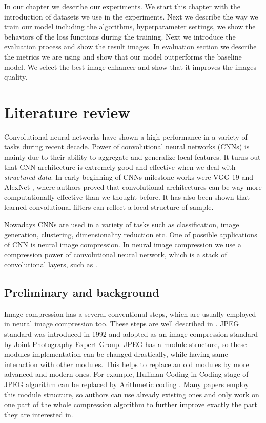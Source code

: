 In our  chapter we describe our experiments. We start this chapter with the introduction of datasets we use in the experiments. Next we describe the way we train our model including the algorithms, hyperparameter settings, we show the behaviors of the loss functions during the training. Next we introduce the evaluation process and show the result images. In evaluation section we describe the metrics we are using and show that our model outperforms the baseline model. We select the best image enhancer and show that it improves the images quality.

\chapter{Literature review}
\label{chapter:literature}

Convolutional neural networks have shown a high performance in a variety of tasks during recent decade. Power of convolutional neural networks (CNNs) is mainly due to their ability to aggregate and generalize local features. It turns out that CNN architecture is extremely good and effective when we deal with \textit{structured data}. In early beginning of CNNs milestone works were VGG-19 \cite{simonyan_very_2015} and AlexNet \cite{alexnet}, where authors proved that convolutional architectures can be way more computationally effective than we thought before. It has also been shown that learned convolutional filters can reflect a local structure of sample.

Nowadays CNNs are used in a variety of tasks such as classification,  image generation, clustering, dimensionality reduction etc. One of possible applications of CNN is neural image compression. In neural image compression we use a compression power of convolutional neural network, which is a stack of convolutional layers, such as \cite{alexnet}.

\section{Preliminary and background}

Image compression has a several conventional steps, which are usually employed in neural image compression too. These steps are well described in \cite{JPEG-1992}. JPEG standard was introduced in 1992 and adopted as an image compression standard by Joint Photography Expert Group. JPEG has a module structure, so these modules implementation can be changed drastically, while having same interaction with other modules. This helps to replace an old modules by more advanced and modern ones. For example, Huffman Coding \cite{Huffman-Coding} in Coding stage of JPEG algorithm can be replaced by Arithmetic coding \cite{Arithmetic-Coding}. Many papers employ this module structure, so authors can use already existing ones and only work on one part of the whole compression algorithm to further improve exactly the part they are interested in.

